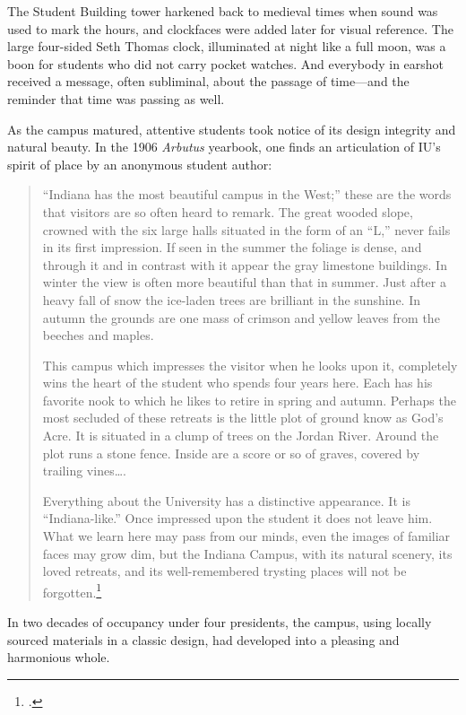 \documentclass[
  american,
  letterpaper,
]{scrreprt}
\begin{document}
The Student Building tower harkened back to medieval times when sound
was used to mark the hours, and clockfaces were added later for visual
reference. The large four-sided Seth Thomas clock, illuminated at night
like a full moon, was a boon for students who did not carry pocket
watches. And everybody in earshot received a message, often subliminal,
about the passage of time---and the reminder that time was passing as
well.

As the campus matured, attentive students took notice of its design
integrity and natural beauty. In the 1906 \emph{Arbutus} yearbook, one
finds an articulation of IU's spirit of place by an anonymous student
author:

\begin{quote}
``Indiana has the most beautiful campus in the West;'' these are the
words that visitors are so often heard to remark. The great wooded
slope, crowned with the six large halls situated in the form of an
``L,'' never fails in its first impression. If seen in the summer the
foliage is dense, and through it and in contrast with it appear the gray
limestone buildings. In winter the view is often more beautiful than
that in summer. Just after a heavy fall of snow the ice-laden trees are
brilliant in the sunshine. In autumn the grounds are one mass of crimson
and yellow leaves from the beeches and maples.

This campus which impresses the visitor when he looks upon it,
completely wins the heart of the student who spends four years here.
Each has his favorite nook to which he likes to retire in spring and
autumn. Perhaps the most secluded of these retreats is the little plot
of ground know as God's Acre. It is situated in a clump of trees on the
Jordan River. Around the plot runs a stone fence. Inside are a score or
so of graves, covered by trailing vines\ldots.

Everything about the University has a distinctive appearance. It is
``Indiana-like.'' Once impressed upon the student it does not leave him.
What we learn here may pass from our minds, even the images of familiar
faces may grow dim, but the Indiana Campus, with its natural scenery,
its loved retreats, and its well-remembered trysting places will not be
forgotten.\footnote{.}
\end{quote}

In two decades of occupancy under four presidents, the campus, using
locally sourced materials in a classic design, had developed into a
pleasing and harmonious whole.
\end{document}
